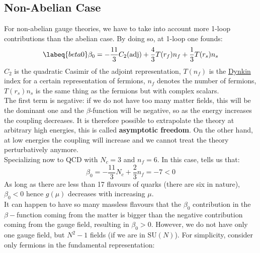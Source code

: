 \documentclass[../main.tex]{subfiles}
\begin{document}
\subsection{Non-Abelian Case}
For non-abelian gauge theories, we have to take into account more 1-loop contributions than the abelian case. By doing so, at 1-loop one founds:
\begin{equation}
\labeq{beta0}
\beta_0=-\frac{11}{3}C_2(\text{adj})+\frac{4}{3}T(r_f)n_f+\frac{1}{3}T(r_s)n_s
\end{equation}
$C_2$ is the quadratic Casimir of the adjoint representation, $T(n_f)$ is the \href{https://en.wikipedia.org/wiki/Eugene_Dynkin}{Dynkin} index for a certain representation of fermions, $n_f$ denotes the number of fermions, $T(r_s)n_s$ is the same thing as the fermions but with complex scalars.\\
The first term is negative: if we do not have too many matter fields, this will be the dominant one and the $\beta$-function will be negative, so as the energy increases the coupling decreases. It is therefore possible to extrapolate the theory at arbitrary high energies, this is called \textbf{asymptotic freedom}. On the other hand, at low energies the coupling will increase and we cannot treat the theory perturbatively anymore.\\
Specializing now to QCD with $N_c=3$ and $n_f=6$. In this case,  tells us that:
\[
\beta_0=-\frac{11}{3}N_c+\frac{2}{3}n_f=-7<0
\]
As long as there are less than 17 flavours of quarks (there are six in nature), $\beta_0<0$ hence $g(\mu)$ decreases with increasing $\mu$.\\
It can happen to have so many massless flavours that the $\beta_0$ contribution in the $\beta-$function coming from the matter is bigger than the negative contribution coming from the gauge field, resulting in $\beta_0>0$. However, we do not have only one gauge field, but $N^2-1$ fields (if we are in SU$(N)$). For simplicity, consider only fermions in the fundamental representation:
\end{document}
